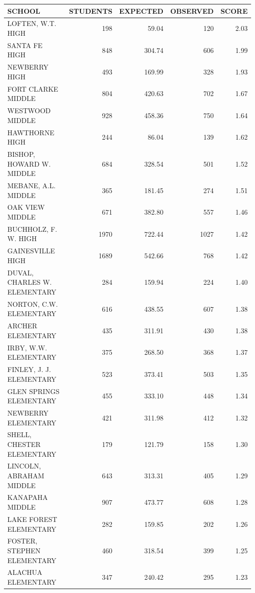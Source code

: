 \documentclass{article}
\begin{document}
\begin{table}[H]
\begin{table}[ht]
\centering
{\tiny
\begin{tabular}{lrrrr}
  \hline
SCHOOL & STUDENTS & EXPECTED & OBSERVED & SCORE \\ 
  \hline
LOFTEN, W.T. HIGH  & 198 & 59.04 & 120 & 2.03 \\ 
  SANTA FE HIGH  & 848 & 304.74 & 606 & 1.99 \\ 
  NEWBERRY HIGH  & 493 & 169.99 & 328 & 1.93 \\ 
  FORT CLARKE MIDDLE  & 804 & 420.63 & 702 & 1.67 \\ 
  WESTWOOD MIDDLE  & 928 & 458.36 & 750 & 1.64 \\ 
  HAWTHORNE HIGH  & 244 & 86.04 & 139 & 1.62 \\ 
  BISHOP, HOWARD W. MIDDLE  & 684 & 328.54 & 501 & 1.52 \\ 
  MEBANE, A.L. MIDDLE  & 365 & 181.45 & 274 & 1.51 \\ 
  OAK VIEW MIDDLE  & 671 & 382.80 & 557 & 1.46 \\ 
  BUCHHOLZ, F. W. HIGH  & 1970 & 722.44 & 1027 & 1.42 \\ 
  GAINESVILLE HIGH  & 1689 & 542.66 & 768 & 1.42 \\ 
  DUVAL, CHARLES W. ELEMENTARY & 284 & 159.94 & 224 & 1.40 \\ 
  NORTON, C.W. ELEMENTARY & 616 & 438.55 & 607 & 1.38 \\ 
  ARCHER ELEMENTARY  & 435 & 311.91 & 430 & 1.38 \\ 
  IRBY, W.W. ELEMENTARY & 375 & 268.50 & 368 & 1.37 \\ 
  FINLEY, J. J. ELEMENTARY & 523 & 373.41 & 503 & 1.35 \\ 
  GLEN SPRINGS ELEMENTARY & 455 & 333.10 & 448 & 1.34 \\ 
  NEWBERRY ELEMENTARY & 421 & 311.98 & 412 & 1.32 \\ 
  SHELL, CHESTER ELEMENTARY & 179 & 121.79 & 158 & 1.30 \\ 
  LINCOLN, ABRAHAM MIDDLE  & 643 & 313.31 & 405 & 1.29 \\ 
  KANAPAHA MIDDLE  & 907 & 473.77 & 608 & 1.28 \\ 
  LAKE FOREST ELEMENTARY & 282 & 159.85 & 202 & 1.26 \\ 
  FOSTER, STEPHEN ELEMENTARY & 460 & 318.54 & 399 & 1.25 \\ 
  ALACHUA ELEMENTARY & 347 & 240.42 & 295 & 1.23 \\ 

\end{tabular}}
\end{table}
\end{table}
\end{document}
